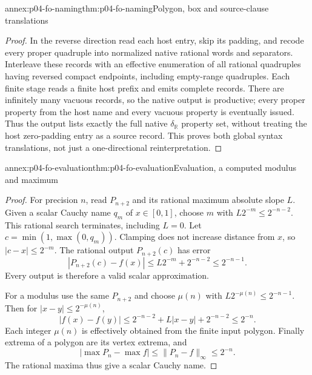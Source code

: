 \begin{annexitem}{annex:p04-fo-naming}{thm:p04-fo-naming}{Polygon, box and source-clause translations}
\begin{proof}
In the reverse direction read each host entry, skip its
padding, and recode every proper quadruple into normalized
native rational words and separators. Interleave these
records with an effective enumeration of all rational
quadruples having reversed compact endpoints, including
empty-range quadruples. Each finite stage reads a finite
host prefix and emits complete records. There are
infinitely many vacuous records, so the native output is
productive; every proper property from the host name and
every vacuous property is eventually issued.
Thus the output lists exactly the full native
\(\delta_{\mathbb R}\) property set, without treating the
host zero-padding entry as a source record.
This proves both global syntax translations, not just a
one-directional reinterpretation.
\end{proof}
\end{annexitem}

\begin{annexitem}{annex:p04-fo-evaluation}{thm:p04-fo-evaluation}{Evaluation, a computed modulus and maximum}
\begin{proof}
For precision \(n\), read \(P_{n+2}\) and its rational maximum
absolute slope \(L\). Given a scalar Cauchy name \(q_m\) of
\(x\in[0,1]\), choose \(m\) with
\(L2^{-m}\leq2^{-n-2}\).
This rational search terminates, including \(L=0\).
Let \(c=\min(1,\max(0,q_m))\). Clamping does not increase
distance from \(x\), so \(|c-x|\leq2^{-m}\).
The rational output \(P_{n+2}(c)\) has error
\[
 |P_{n+2}(c)-f(x)|
 \leq L2^{-m}+2^{-n-2}\leq2^{-n-1}.
\]
Every output is therefore a valid scalar approximation.

For a modulus use the same \(P_{n+2}\) and choose \(\mu(n)\)
with \(L2^{-\mu(n)}\leq2^{-n-1}\).
Then for \(|x-y|\leq2^{-\mu(n)}\),
\[
 |f(x)-f(y)|
 \leq2^{-n-2}+L|x-y|+2^{-n-2}\leq2^{-n}.
\]
Each integer \(\mu(n)\) is effectively obtained from the
finite input polygon. Finally extrema of a polygon are its
vertex extrema, and
\[
 |\max P_n-\max f|\leq\lVert P_n-f\rVert_\infty\leq2^{-n}.
\]
The rational maxima thus give a scalar Cauchy name.
\end{proof}
\end{annexitem}


